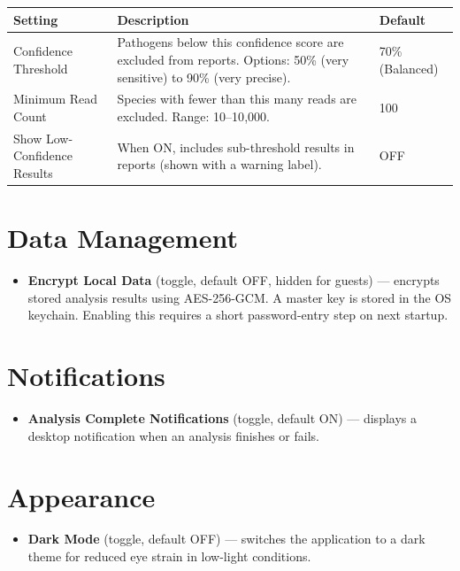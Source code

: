 \documentclass[12pt,a4paper]{report}
\begin{document}
\begin{center}
\begin{tabularx}{\textwidth}{lXl}
  \toprule
  \textbf{Setting} & \textbf{Description} & \textbf{Default} \\
  \midrule
  Confidence Threshold &
  Pathogens below this confidence score are excluded from reports. Options: 50\% (very sensitive) to 90\% (very precise). &
  70\% (Balanced) \\[4pt]
  Minimum Read Count &
  Species with fewer than this many reads are excluded. Range: 10--10{,}000. &
  100 \\[4pt]
  Show Low-Confidence Results &
  When ON, includes sub-threshold results in reports (shown with a warning label). &
  OFF \\
  \bottomrule
\end{tabularx}
\end{center}

\section{Data Management}

\begin{itemize}[leftmargin=1.5em]
  \item \textbf{Encrypt Local Data} (toggle, default OFF, hidden for guests) — encrypts stored analysis results using AES-256-GCM. A master key is stored in the OS keychain. Enabling this requires a short password-entry step on next startup.
\end{itemize}

\section{Notifications}

\begin{itemize}[leftmargin=1.5em]
  \item \textbf{Analysis Complete Notifications} (toggle, default ON) — displays a desktop notification when an analysis finishes or fails.
\end{itemize}

\section{Appearance}

\begin{itemize}[leftmargin=1.5em]
  \item \textbf{Dark Mode} (toggle, default OFF) — switches the application to a dark theme for reduced eye strain in low-light conditions.
\end{itemize}
\end{document}
